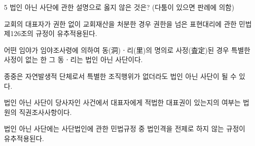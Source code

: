 \begin{question}{5}
법인 아닌 사단에 관한 설명으로 옳지 않은 것은? (다툼이 있으면 판례에 의함)
\begin{choices}
  \item 교회의 대표자가 권한 없이 교회재산을 처분한 경우 권한을 넘은 표현대리에 관한 민법 제126조의 규정이 유추적용된다.
  \item 어떤 임야가 임야조사령에 의하여 동(洞)ㆍ리(里)의 명의로 사정(査定)된 경우 특별한 사정이 없는 한 그 동ㆍ리는 법인 아닌 사단이다.
  \item 종중은 자연발생적 단체로서 특별한 조직행위가 없더라도 법인 아닌 사단이 될 수 있다.
  \item 법인 아닌 사단이 당사자인 사건에서 대표자에게 적법한 대표권이 있는지의 여부는 법원의 직권조사사항이다.
  \item 법인 아닌 사단에는 사단법인에 관한 민법규정 중 법인격을 전제로 하지 않는 규정이 유추적용된다.
\end{choices}
\end{question}
